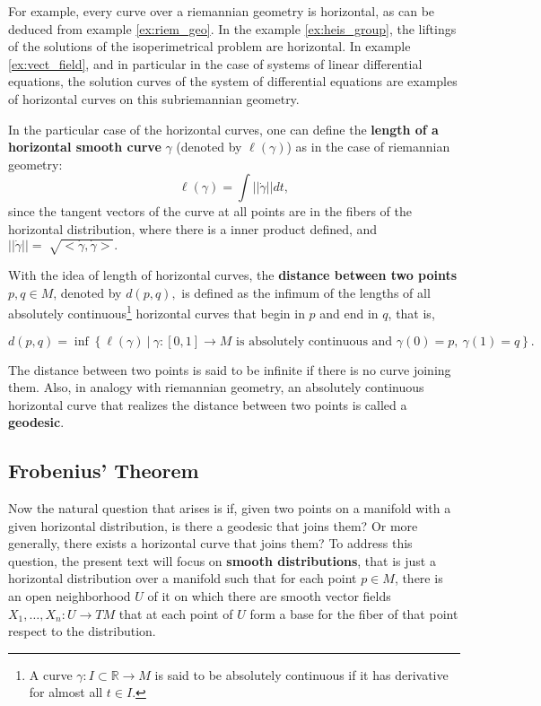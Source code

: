 \documentclass[12pt, letterpaper, reqno]{amsart}
\theoremstyle{definition}
\theoremstyle{plain}
\theoremstyle{remark}
\begin{document}
For example, every curve over a riemannian geometry is horizontal, as can be deduced from example \ref{ex:riem_geo}. In the example \ref{ex:heis_group}, the liftings of the solutions of the isoperimetrical problem are horizontal. In example \ref{ex:vect_field}, and in particular in the case of systems of linear differential equations, the solution curves of the system of differential equations are examples of horizontal curves on this subriemannian geometry.

In the particular case of the horizontal curves, one can define the \textbf{length of a horizontal smooth curve} $ \gamma $ (denoted by $ \ell(\gamma) $) as in the case of riemannian geometry:
$$ \ell(\gamma) = \int ||\dot{\gamma}|| dt, $$ 
since the tangent vectors of the curve at all points are in the fibers of the horizontal distribution, where there is a inner product defined, and $ ||\dot{\gamma}||= \sqrt[]{<\dot{\gamma}, \dot{\gamma}>}.  $   

With the idea of length of horizontal curves, the \textbf{distance between two points} $ p,q\in M $, denoted by $ d(p,q), $   is defined as the infimum of the lengths of all absolutely continuous\footnote{A curve $ \gamma:I\subset \mathbb{R}  \rightarrow {M} $ is said to be absolutely continuous if it has derivative for almost all $ t\in I. $ } horizontal curves that begin in $ p $ and end in $ q $, that is, 

$$ d(p,q) = \operatorname{inf} \left\{ \ell(\gamma) \ |\ \gamma:[0,1] \rightarrow {M} \text{ is absolutely continuous and }\gamma(0)=p, \ \gamma(1)=q \right\}. $$ 

The distance between two points is said to be infinite if there is no curve joining them. Also, in analogy with riemannian geometry, an absolutely continuous horizontal curve that realizes the distance between two points is called a \textbf{geodesic}. 

\subsection{Frobenius' Theorem}%
\label{sub:chow_s_theorem}


Now the natural question that arises is if, given two points on a manifold with a given horizontal distribution, is there a geodesic that joins them? Or more generally, there exists a horizontal curve that joins them? To address this question, the present text will focus on \textbf{smooth distributions}, that is just a horizontal distribution over a manifold such that for each point $ p\in M $, there is an open neighborhood $ U $ of it on which there are smooth vector fields $ X_1,\dots,X_n: U \rightarrow {TM} $ that at each point of $ U $ form a base for the fiber of that point respect to the distribution.
\end{document}

